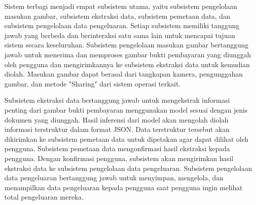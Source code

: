 Sistem terbagi menjadi empat subsistem utama, yaitu subsistem pengelolaan masukan gambar, subsistem ekstraksi data, subsistem pemetaan data, dan subsistem pengelolaan data pengeluaran. Setiap subsistem memiliki tanggung jawab yang berbeda dan berinteraksi satu sama lain untuk mencapai tujuan sistem secara keseluruhan. Subsistem pengelolaan masukan gambar bertanggung jawab untuk menerima dan memproses gambar bukti pembayaran yang diunggah oleh pengguna dan mengirimkannya ke subsistem ekstraksi data untuk kemudian diolah. Masukan gambar dapat berasal dari tangkapan kamera, pengunggahan gambar, dan metode "Sharing" dari sistem operasi terkait. 

Subsistem ekstraksi data bertanggung jawab untuk mengekstrak informasi penting dari gambar bukti pembayaran menggunakan model \donut{} sesuai dengan jenis dokumen yang diunggah. Hasil inferensi dari model  akan mengolah diolah informasi terstruktur dalam format JSON. Data terstruktur tersebut akan dikirimkan ke subsistem pemetaan data untuk dipetakan agar dapat dilihat oleh pengguna. Subsistem pemetaan data mengonfirmasi hasil ekstraksi kepada pengguna. Dengan konfirmasi pengguna, subsistem akan mengirimkan hasil ekstraksi data ke subsistem pengelolaan data pengeluaran. Subsistem pengelolaan data pengeluaran bertanggung jawab untuk menyimpan, mengelola, dan menampilkan data pengeluaran kepada pengguna saat pengguna ingin melihat total pengeluaran mereka.